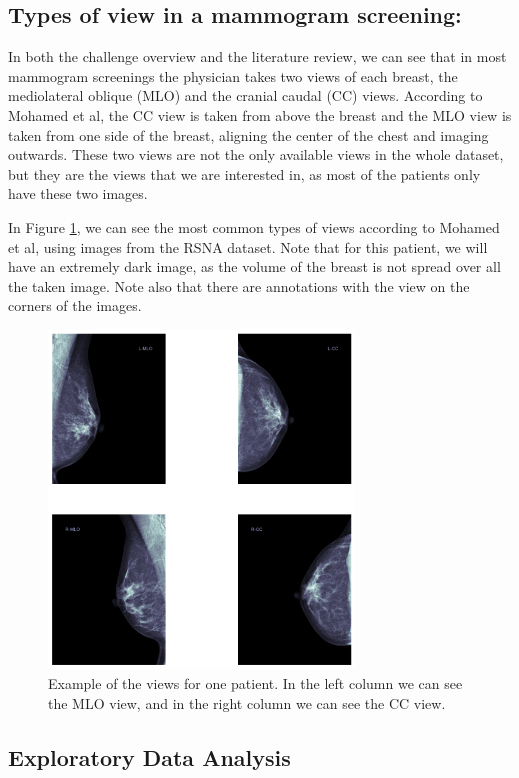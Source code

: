 \documentclass[conference]{IEEEtran}
\begin{document}
\subsection{Types of view in a mammogram screening:}

In both the challenge overview and the literature review, we can see that in most mammogram screenings the physician takes two views of each breast, the mediolateral oblique (MLO) and the cranial caudal (CC) views. According to Mohamed et al, the CC view is taken from above the breast and the MLO view is taken from one side of the breast, aligning the center of the chest and imaging outwards. These two views are not the only available views in the whole dataset, but they are the views that we are interested in, as most of the patients only have these two images. 

In Figure \ref{fig:types_of_view}, we can see the most common types of views according to Mohamed et al, using images from the RSNA dataset. Note that for this patient, we will have an extremely dark image, as the volume of the breast is not spread over all the taken image. Note also that there are annotations with the view on the corners of the images. 

\begin{figure}[ht]
\centering
\includegraphics[width=3.2in]{breast_images}
\caption{Example of the views for one patient. In the left column we can see the MLO view, and in the right column we can see the CC view. }
\label{fig:types_of_view}
\end{figure}

\subsection{Exploratory Data Analysis}
\end{document}
